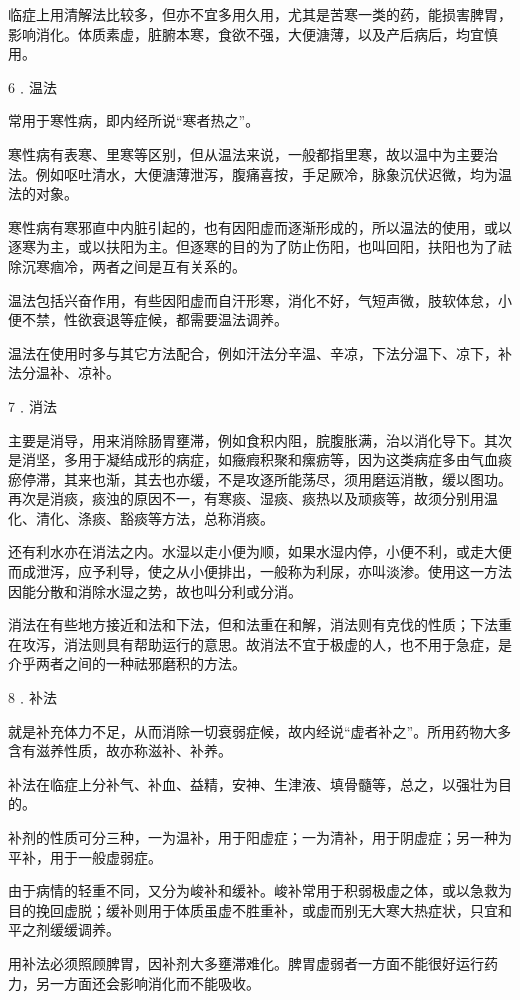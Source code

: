\documentclass[12pt,UTF8]{ctexbook}
\begin{document}
临症上用清解法比较多，但亦不宜多用久用，尤其是苦寒一类的药，能损害脾胃，影响消化。体质素虚，脏腑本寒，食欲不强，大便溏薄，以及产后病后，均宜慎用。

6﹒温法

常用于寒性病，即内经所说“寒者热之”。

寒性病有表寒、里寒等区别，但从温法来说，一般都指里寒，故以温中为主要治法。例如呕吐清水，大便溏薄泄泻，腹痛喜按，手足厥冷，脉象沉伏迟微，均为温法的对象。

寒性病有寒邪直中内脏引起的，也有因阳虚而逐渐形成的，所以温法的使用，或以逐寒为主，或以扶阳为主。但逐寒的目的为了防止伤阳，也叫回阳，扶阳也为了祛除沉寒痼冷，两者之间是互有关系的。

温法包括兴奋作用，有些因阳虚而自汗形寒，消化不好，气短声微，肢软体怠，小便不禁，性欲衰退等症候，都需要温法调养。

温法在使用时多与其它方法配合，例如汗法分辛温、辛凉，下法分温下、凉下，补法分温补、凉补。

7﹒消法

主要是消导，用来消除肠胃壅滞，例如食积内阻，脘腹胀满，治以消化导下。其次是消坚，多用于凝结成形的病症，如癥瘕积聚和瘰疬等，因为这类病症多由气血痰瘀停滞，其来也渐，其去也亦缓，不是攻逐所能荡尽，须用磨运消散，缓以图功。再次是消痰，痰浊的原因不一，有寒痰、湿痰、痰热以及顽痰等，故须分别用温化、清化、涤痰、豁痰等方法，总称消痰。

还有利水亦在消法之内。水湿以走小便为顺，如果水湿内停，小便不利，或走大便而成泄泻，应予利导，使之从小便排出，一般称为利尿，亦叫淡渗。使用这一方法因能分散和消除水湿之势，故也叫分利或分消。

消法在有些地方接近和法和下法，但和法重在和解，消法则有克伐的性质；下法重在攻泻，消法则具有帮助运行的意思。故消法不宜于极虚的人，也不用于急症，是介乎两者之间的一种祛邪磨积的方法。

8﹒补法

就是补充体力不足，从而消除一切衰弱症候，故内经说“虚者补之”。所用药物大多含有滋养性质，故亦称滋补、补养。

补法在临症上分补气、补血、益精，安神、生津液、填骨髓等，总之，以强壮为目的。

补剂的性质可分三种，一为温补，用于阳虚症；一为清补，用于阴虚症；另一种为平补，用于一般虚弱症。

由于病情的轻重不同，又分为峻补和缓补。峻补常用于积弱极虚之体，或以急救为目的挽回虚脱；缓补则用于体质虽虚不胜重补，或虚而别无大寒大热症状，只宜和平之剂缓缓调养。

用补法必须照顾脾胃，因补剂大多壅滞难化。脾胃虚弱者一方面不能很好运行药力，另一方面还会影响消化而不能吸收。
\end{document}
